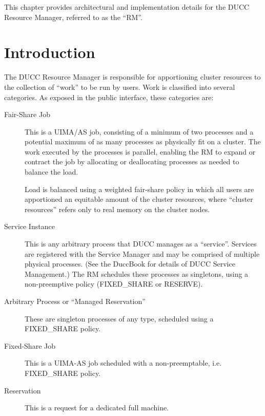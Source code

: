 % 
% 
% 
% 


This chapter provides architectural and implementation details for the DUCC
Resource Manager, referred to as the ``RM''.
\section{Introduction}

The DUCC Resource Manager is responsible for apportioning cluster resources to the
collection of ``work'' to be run by users.  Work is classified into several categories.  As
exposed in the public interface, these categories are:

\begin{description}
  \item[Fair-Share Job] This is a UIMA/AS job, consisting of a minimum of two processes and 
    a potential maximum of as many processes as physically fit on a cluster.  The work
    executed by the processes is parallel, enabling the RM to expand or contract
    the job by allocating or deallocating processes as needed to balance the load.

    Load is balanced using a weighted fair-share policy in which all users are apportioned an
    equitable amount of the cluster resources, where ``cluster resources'' refers only to real
    memory on the cluster nodes.

  \item[Service Instance] This is any arbitrary process that DUCC manages as a ``service''.
    Services are registered with the Service Manager and may be comprised of multiple physical
    processes.  (See the DuccBook for details of DUCC Service Management.)  The RM schedules these
    processes as singletons, using a non-preemptive policy (FIXED\_SHARE or RESERVE).

  \item[Arbitrary Process or ``Managed Reservation''] These are singleton processes of any type, scheduled
    using a FIXED\_SHARE policy.

  \item[Fixed-Share Job] This is a UIMA-AS job scheduled with a non-preemptable, i.e. FIXED\_SHARE
    policy.

  \item[Reservation] This is a request for a dedicated full machine.
\end{description}

